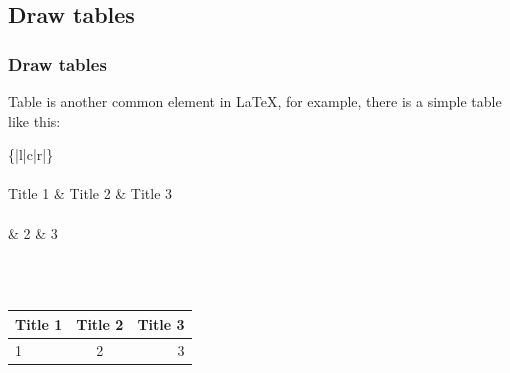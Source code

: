 \begin{frame}
\begin{minipage}{0.4\linewidth}
\begin{figure}[htbp]
{				\label{fig-sample-2}
			}
		\end{figure}
	\end{minipage}
\end{frame}

\subsection{Draw tables}

\begin{frame}
	\frametitle{Draw tables}
	Table is another common element in \LaTeX, for example, there is a simple table like this:
    \begin{example}
    	\{|l|c|r|\}\\
		\qquad {}\\
		\qquad Title 1 \& Title 2 \& Title 3 \samplecommand{\textbackslash} \\
		\qquad {}\\
		 \& 2 \& 3 \samplecommand{\textbackslash} \\
		\qquad {}\\
    \end{example}
    \ \\
	\begin{tabular}{|l|c|r|}
        \hline
        Title 1 & Title 2 & Title 3 \\
        \hline
        1 & 2 &3 \\
        \hline
       \end{tabular}
\end{frame}

